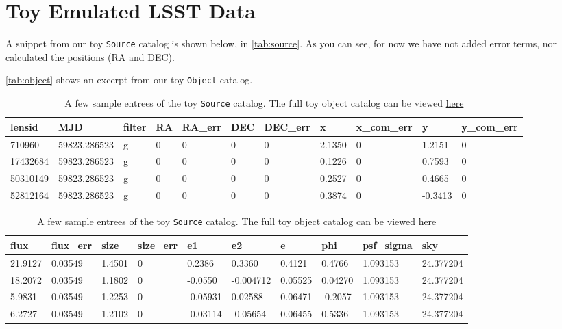 \documentclass[\docopts]{\docclass}
\def\Object{\texttt{Object}\xspace}
\def\Source{\texttt{Source}\xspace}
\begin{document}

\section{Toy Emulated LSST Data}
\label{sec:data}

A snippet from our toy \Source catalog is shown below, in
\autoref{tab:source}. As you can see, for now we have not added error
terms, nor calculated the positions (RA and DEC).

\autoref{tab:object} shows an excerpt from our toy \Object catalog.


\begin{table}[!h]
\centering
\begin{tabular}{|l|l|l|l|l|l|l|l|l|l|l|}
\hline
lensid   & MJD          & filter & RA & RA\_err & DEC & DEC\_err & x              & x\_com\_err & y               & y\_com\_err \\ \hline
710960   & 59823.286523 & g      & 0  & 0       & 0   & 0        & 2.1350  & 0           & 1.2151 & 0			\\
17432684 & 59823.286523 & g      & 0  & 0       & 0   & 0        & 0.1226 & 0           & 0.7593  & 0           \\
50310149 & 59823.286523 & g      & 0  & 0       & 0   & 0        & 0.2527 & 0           & 0.4665  & 0           \\
52812164 & 59823.286523 & g      & 0  & 0       & 0   & 0        & 0.3874 & 0           & -0.3413 & 0          \\ \hline
\end{tabular}
\begin{tabular}{|l|l|l|l|l|l|l|l|l|l|}
\hline
flux          & flux\_err       & size          & size\_err & e1               & e2                & e               & phi             & psf\_sigma & sky       \\ \hline
21.9127 & 0.03549 & 1.4501 & 0         & 0.2386    & 0.3360    & 0.4121  & 0.4766  & 1.093153   & 24.377204 \\
18.2072 & 0.03549& 1.1802  & 0         & -0.0550 & -0.004712  & 0.05525 & 0.04270 & 1.093153   & 24.377204 \\
5.9831 & 0.03549 & 1.2253 & 0         & -0.05931 & 0.02588     & 0.06471 & -0.2057 & 1.093153   & 24.377204 \\
6.2727 & 0.03549 & 1.2102  & 0         & -0.03114 & -0.05654  & 0.06455 & 0.5336  & 1.093153   & 24.377204 \\ \hline
\end{tabular}
\caption{A few sample entrees of the toy \Source catalog. The full toy object catalog can be viewed \href{https://www.dropbox.com/s/muqui8eu3kxox2l/toy_source_catalog.csv?dl=0}{here}}
\label{tab:source}
\end{table}
\end{document}
